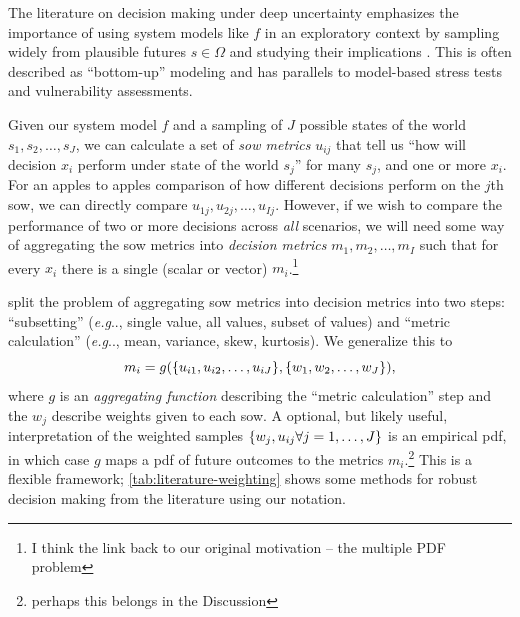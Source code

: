 \documentclass[12pt]{article}
\makeatletter
\DeclareRobustCommand\onedot{\futurelet\@let@token\@onedot}
\def\@onedot{\ifx\@let@token.\else.\null\fi\xspace}
\def\eg{\emph{e.g}\onedot} \def\Eg{\emph{E.g}\onedot}
\makeatother
\begin{document}
The literature on decision making under deep uncertainty \citep[see][for a review]{marchau:2019} emphasizes the importance of using system models like $f$ in an exploratory context by sampling widely from plausible futures $s \in \Omega$ and studying their implications \citep{bankes:1993,lempert_shaping:2003,kwakkel:2019,lamontagne_discovery:2018}.
This is often described as ``bottom-up'' modeling \citep{Brown:2012kb} and has parallels to model-based stress tests and vulnerability assessments.

Given our system model $f$ and a sampling of $J$ possible states of the world $s_1, s_2, \ldots, s_J$, we can calculate a set of \emph{\gls{sow} metrics} $u_{ij}$ that tell us ``how will decision $x_i$ perform under state of the world $s_j$'' for many $s_j$, and one or more $x_i$.
For an apples to apples comparison of how different decisions perform on the $j$th \gls{sow}, we can directly compare $u_{1j}, u_{2j}, \ldots, u_{Ij}$.
However, if we wish to compare the performance of two or more decisions across \emph{all} scenarios, we will need some way of aggregating the \gls{sow} metrics into \emph{decision metrics} $m_1, m_2, \ldots, m_I$ such that for every $x_i$ there is a single (scalar or vector) $m_i$.\footnote{I think the link back to our original motivation -- the multiple PDF problem}

\citet{mcphail_robustness:2019} split the problem of aggregating \gls{sow} metrics into decision metrics into two steps: ``subsetting'' (\eg, single value, all values, subset of values) and ``metric calculation'' (\eg, mean, variance, skew, kurtosis).
We generalize this to
\begin{equation}
    m_i = g(\qty{u_{i1}, u_{i2}, \ldots, u_{iJ}}, \qty{w_1, w_2, \ldots, w_J}),
\end{equation}
where $g$ is an \emph{aggregating function} describing the ``metric calculation'' step and the $w_j$ describe weights given to each \gls{sow}.
A optional, but likely useful, interpretation of the weighted samples $\qty{w_j, u_{ij} \forall j=1, \ldots, J}$ is an empirical \gls{pdf}, in which case $g$ maps a \gls{pdf} of future outcomes to the metrics $m_i$.\footnote{perhaps this belongs in the Discussion}
This is a flexible framework; \cref{tab:literature-weighting} shows some methods for robust decision making from the literature using our notation.
\end{document}
